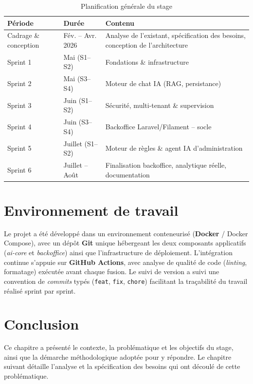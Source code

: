 \begin{table}[h]
\centering
\caption{Planification générale du stage}
\label{tab:planification}
\begin{tabular}{@{}p{4cm}p{3cm}p{7cm}@{}}
\toprule
\textbf{Période} & \textbf{Durée} & \textbf{Contenu} \\
\midrule
Cadrage \& conception & Fév. -- Avr. 2026 & Analyse de l'existant, spécification des besoins, conception de l'architecture \\
Sprint 1 & Mai (S1--S2) & Fondations \& infrastructure \\
Sprint 2 & Mai (S3--S4) & Moteur de chat IA (RAG, persistance) \\
Sprint 3 & Juin (S1--S2) & Sécurité, multi-tenant \& supervision \\
Sprint 4 & Juin (S3--S4) & Backoffice Laravel/Filament -- socle \\
Sprint 5 & Juillet (S1--S2) & Moteur de règles \& agent IA d'administration \\
Sprint 6 & Juillet -- Août & Finalisation backoffice, analytique réelle, documentation \\
\bottomrule
\end{tabular}
\end{table}

\section{Environnement de travail}

Le projet a été développé dans un environnement conteneurisé (\textbf{Docker} / Docker Compose), avec un dépôt \textbf{Git} unique hébergeant les deux composants applicatifs (\emph{ai-core} et \emph{backoffice}) ainsi que l'infrastructure de déploiement. L'intégration continue s'appuie sur \textbf{GitHub Actions}, avec analyse de qualité de code (\emph{linting}, formatage) exécutée avant chaque fusion. Le suivi de version a suivi une convention de \emph{commits} typés (\texttt{feat}, \texttt{fix}, \texttt{chore}) facilitant la traçabilité du travail réalisé sprint par sprint.

\section*{Conclusion}

Ce chapitre a présenté le contexte, la problématique et les objectifs du stage, ainsi que la démarche méthodologique adoptée pour y répondre. Le chapitre suivant détaille l'analyse et la spécification des besoins qui ont découlé de cette problématique.
